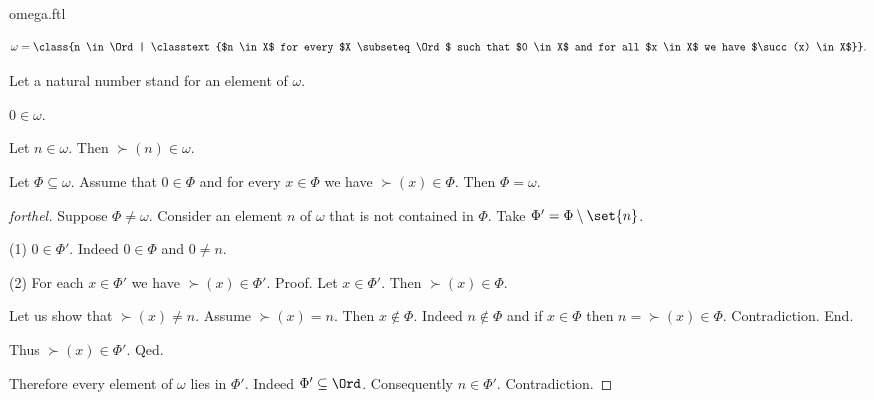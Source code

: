 \documentclass{naproche-library}
\begin{document}
\begin{smodule}[title=Natural Numbers]{omega.ftl}

\begin{definition}[forthel,id=SET_THEORY_03_4310076227584000]
  \[ \omega = \class{n \in \Ord | \classtext{$n \in X$ for every $X \subseteq \Ord$ such that $0 \in X$ and for all $x \in X$ we have $\succ(x) \in X$}}. \]

Let a natural number stand for an element of $\omega$.
\end{definition}

\begin{proposition}[forthel,id=SET_THEORY_03_3576717620805632]
  $0 \in \omega$.
\end{proposition}

\begin{proposition}[forthel,id=SET_THEORY_03_8807317141192704]
  Let $n \in \omega$.
  Then $\succ(n) \in \omega$.
\end{proposition}

\begin{proposition}[forthel,id=SET_THEORY_03_344585425387520]
  Let $\Phi \subseteq \omega$.
  Assume that $0 \in \Phi$ and for every $x \in \Phi$ we have
  $\succ(x) \in \Phi$.
  Then $\Phi = \omega$.
\end{proposition}
\begin{proof}[forthel]
  Suppose $\Phi \neq \omega$.
  Consider an element $n$ of $\omega$ that is not contained in $\Phi$.
  Take $\Phi' = \Phi \setminus \set{n}$.

  (1) $0 \in \Phi'$.
  Indeed $0 \in \Phi$ and $0 \neq n$.

  (2) For each $x \in \Phi'$ we have $\succ(x) \in \Phi'$. \newline
  Proof.
    Let $x \in \Phi'$.
    Then $\succ(x) \in \Phi$.

    Let us show that $\succ(x) \neq n$.
      Assume $\succ(x) = n$.
      Then $x \notin \Phi$.
      Indeed $n \notin \Phi$ and if $x \in \Phi$ then
      $n = \succ(x) \in \Phi$.
      Contradiction.
    End.

    Thus $\succ(x) \in \Phi'$.
  Qed.

  Therefore every element of $\omega$ lies in $\Phi'$.
  Indeed $\Phi' \subseteq \Ord$.
  Consequently $n \in \Phi'$.
  Contradiction.
\end{proof}


\end{smodule}
\end{document}
